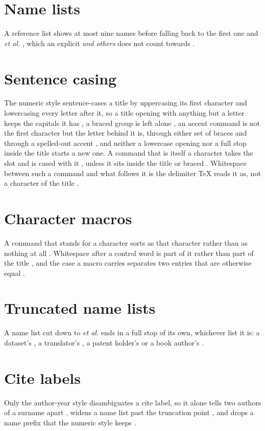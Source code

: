 \documentclass[acmsmall,nonacm,natbib=false]{acmart}
\begin{document}
\section*{Name lists}
A reference list shows at most nine names \cite{MbNine} before falling back to the first one and \emph{et al.} \cite{MbTen,MbTenEditors}, which an explicit \emph{and others} does not count towards \cite{MbNineOthers}.

\section*{Sentence casing}
The numeric style sentence-cases a title by uppercasing its first character and lowercasing every letter after it, so a title opening with anything but a letter keeps the capitals it has \cite{ScDigit,ScDigit2,ScQuote,ScParen}, a braced group is left alone \cite{ScBraced,ScProtect,ScAccWord}, an accent command is not the first character but the letter behind it is, through either set of braces \cite{ScAccent,ScAccBrace,ScAccGroup} and through a spelled-out accent \cite{ScWordAcc,ScWordCed}, and neither a lowercase opening \cite{ScLower} nor a full stop inside the title \cite{ScShout,ScPeriod} starts a new one.
A command that is itself a character takes the slot and is cased with it \cite{ScCharAe,ScCharSs,ScCharI}, unless it sits inside the title \cite{ScCharMid} or braced \cite{ScCharBrace}.
Whitespace between such a command and what follows it is the delimiter TeX reads it as, not a character of the title \cite{ScWordSp,ScCharSp,ScSymSp,ScSsSp}.

\section*{Character macros}
A command that stands for a character sorts as that character rather than as nothing at all \cite{CmAdept,CmAesop,CmAlpha,CmLima,CmLodz,CmLuna,CmSmith,CmSsmith,CmSzabo}.
Whitespace after a control word is part of it rather than part of the title \cite{CmSpace}, and the case a macro carries separates two entries that are otherwise equal \cite{CmCaseUpper,CmCaseLower}.

\section*{Truncated name lists}
A name list cut down to \emph{et al.} ends in a full stop of its own, whichever list it is: a dataset's \cite{TrDataset}, a translator's \cite{TrTranslator}, a patent holder's \cite{TrHolder} or a book author's \cite{TrBookauthor}.

\section*{Cite labels}
Only the author-year style disambiguates a cite label, so it alone tells two authors of a surname apart \citeauthor{UnSmithJohn} \citeauthor{UnSmithJane}, widens a name list past the truncation point \citeauthor{UnListA} \citeauthor{UnListB}, and drops a name prefix that the numeric style keeps \citeauthor{UnPrefix}.

\printbibliography
\end{document}
